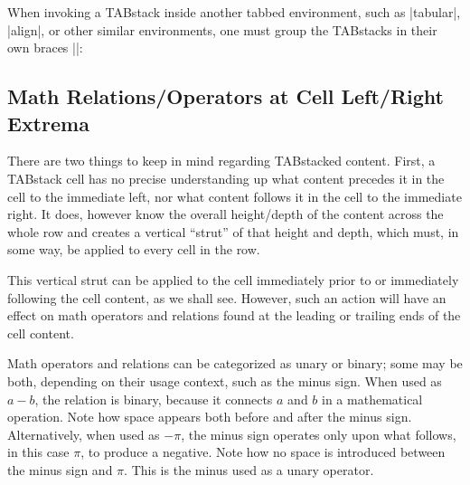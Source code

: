 \documentclass{article}
\def\ste{\textsf{stackengine}}   \def\loi{\textsf{listofitems}}
\def\vbspecial#1>{\textit{\rmfamily#1}}
\def\vbdelim{\catcode`<=\active \catcode`>=\active \catcode`!=\active \def<{\vbspecial}\def>{}\def!{\textrm{(provided by \ste)}}}
\begin{document}
When invoking a TABstack inside another tabbed environment, such as
  \vb|tabular|, \vb|align|, or other similar environments, one must group
  the TABstacks in their own braces \vb|{}|:
\begin{verbnobox}[\footnotesize\vbdelim]
\end{verbnobox}
{%

\subsection*{Math Relations/Operators at Cell Left/Right Extrema}

There are two things to keep in mind regarding TABstacked content.  
First, a TABstack cell has no precise understanding up what content precedes 
  it in the cell to the immediate left, nor what content follows it in the 
  cell to the immediate right.  
It does, however know the overall height/depth of the content across the whole 
  row and creates a vertical ``strut'' of that height and depth, which must,
  in some way,  be applied to every cell in the row.  

This vertical strut can be applied to the cell immediately prior to or 
  immediately following the cell content, as we shall see.  
However, such an action will have an effect on math operators and relations 
  found at the leading or trailing ends of the cell content.  

Math operators and relations can be categorized as unary or binary; some
  may be both, depending on their usage context, such as the minus sign.  
When used as $a-b$, the relation is binary, because it connects $a$ and $b$ 
  in a mathematical operation.  
Note how space appears both before and after the minus sign.  
Alternatively, when used as $-\pi$, the minus sign operates only upon what 
  follows, in this case $\pi$, to produce a negative.  
Note how no space is introduced between the minus sign and $\pi$.
This is the minus used as a unary operator.

}
\end{document}
